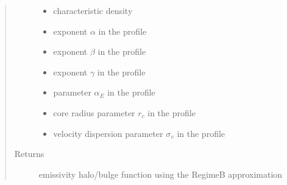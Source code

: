 \documentclass[letterpaper,10pt,english]{sphinxmanual}
\begin{document}
\begin{fulllineitems}
\begin{quote}
\begin{description}
\begin{itemize}
\item {} 
\sphinxAtStartPar
{} \textendash{} characteristic density

\item {} 
\sphinxAtStartPar
{} \textendash{} exponent \(\alpha\) in the {\hyperref[\detokenize{diffsph.profiles:diffsph.profiles.templates.hdz}]{}} profile

\item {} 
\sphinxAtStartPar
{} \textendash{} exponent \(\beta\) in the {\hyperref[\detokenize{diffsph.profiles:diffsph.profiles.templates.hdz}]{}} profile

\item {} 
\sphinxAtStartPar
{} \textendash{} exponent \(\gamma\) in the {\hyperref[\detokenize{diffsph.profiles:diffsph.profiles.templates.hdz}]{}} profile

\item {} 
\sphinxAtStartPar
{} \textendash{} parameter \(\alpha_E\) in the {\hyperref[\detokenize{diffsph.profiles:diffsph.profiles.templates.enst}]{}} profile

\item {} 
\sphinxAtStartPar
{} \textendash{} core radius parameter \(r_c\) in the {\hyperref[\detokenize{diffsph.profiles:diffsph.profiles.templates.cnfw}]{}} profile

\item {} 
\sphinxAtStartPar
{} \textendash{} velocity dispersion parameter \(\sigma_v\) in the {\hyperref[\detokenize{diffsph.profiles:diffsph.profiles.templates.sis}]{}} profile

\end{itemize}

\item[{Returns}] \leavevmode
\sphinxAtStartPar
emissivity halo/bulge function using the Regime\sphinxhyphen{}B approximation

\end{description}\end{quote}

\end{fulllineitems}
\end{document}
